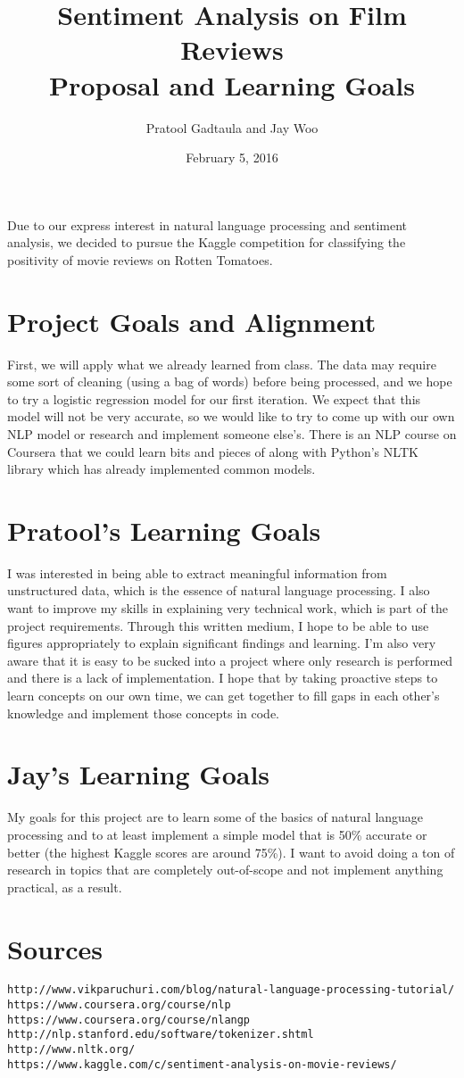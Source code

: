 \documentclass[10pt]{article}
\title{Sentiment Analysis on Film Reviews\\
		\Large Proposal and Learning Goals}
\author{Pratool Gadtaula and Jay Woo}
\date{February 5, 2016}
\begin{document}
\maketitle
Due to our express interest in natural language processing and sentiment analysis, we decided to pursue the Kaggle competition for classifying the positivity of movie reviews on Rotten Tomatoes.

\section{Project Goals and Alignment}
First, we will apply what we already learned from class. The data may require some sort of cleaning (using a bag of words) before being processed, and we hope to try a logistic regression model for our first iteration. We expect that this model will not be very accurate, so we would like to try to come up with our own NLP model or research and implement someone else’s. There is an NLP course on Coursera that we could learn bits and pieces of along with Python’s NLTK library which has already implemented common models.

\section{Pratool’s Learning Goals}
I was interested in being able to extract meaningful information from unstructured data, which is the essence of natural language processing. I also want to improve my skills in explaining very technical work, which is part of the project requirements. Through this written medium, I hope to be able to use figures appropriately to explain significant findings and learning. I'm also very aware that it is easy to be sucked into a project where only research is performed and there is a lack of implementation. I hope that by taking proactive steps to learn concepts on our own time, we can get together to fill gaps in each other's knowledge and implement those concepts in code.

\section{Jay’s Learning Goals}
My goals for this project are to learn some of the basics of natural language processing and to at least implement a simple model that is 50\% accurate or better (the highest Kaggle scores are around 75\%). I want to avoid doing a ton of research in topics that are completely out-of-scope and not implement anything practical, as a result.

\section*{Sources}
\texttt{http://www.vikparuchuri.com/blog/natural-language-processing-tutorial/ \\
https://www.coursera.org/course/nlp \\
https://www.coursera.org/course/nlangp \\
http://nlp.stanford.edu/software/tokenizer.shtml \\
http://www.nltk.org/ \\
https://www.kaggle.com/c/sentiment-analysis-on-movie-reviews/}
\end{document}
